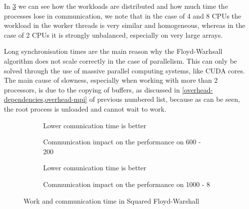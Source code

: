 In \cref{work-and-communication-time} we can see how the workloads are distributed and how much time the processes lose in communication, we note that in the case of 4 and 8 CPUs the workload in the worker threads is very similar and homogeneous, whereas in the case of 2 CPUs it is strongly unbalanced, especially on very large arrays.

Long synchronisation times are the main reason why the Floyd-Warhsall algorithm does not scale correctly in the case of parallelism. This can only be solved through the use of massive parallel computing systems, like CUDA cores.
The main cause of slowness, especially when working with more than 2 processors, is due to the copying of buffers, as discussed in \cref{overhead-dependencies,overhead-mpi} of previous numbered list, because as can be seen, the root process is unloaded and cannot wait to work.

\begin{figure}[htbp]
    \datatable
    \begin{subfigure}[t]{0.5\textwidth}
                
        \caption*{Lower comunication time is better}
        \caption{Communication impact on the performance on 600 - 200}
        \label{commimpact600_24}
    \end{subfigure}
    \datatable
    \begin{subfigure}[t]{0.5\textwidth}
        
        \caption*{Lower comunication time is better}
        \caption{Communication impact on the performance on 1000 - 8}
        \label{commimpact1000_40}
    \end{subfigure}

    \caption{Work and communication time in Squared Floyd-Warshall}
    \label{work-and-communication-time}
\end{figure}

